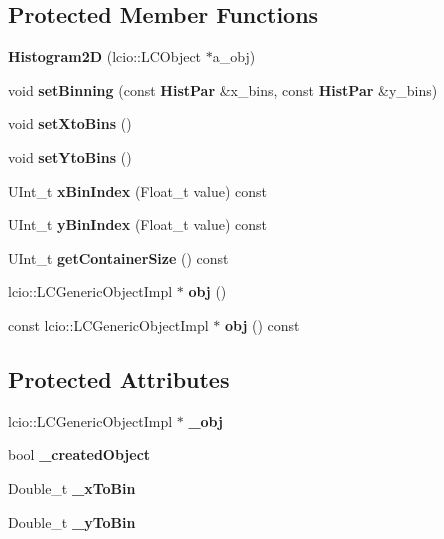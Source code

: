 \subsection*{Protected Member Functions}
\begin{DoxyCompactItemize}
\item 
{\bfseries Histogram2D} (lcio::LCObject $\ast$a\_\-obj)\label{classhistmgr_1_1Histogram2D_ade05eeddf75a2b5e341194c77fb9d101}

\item 
void {\bfseries setBinning} (const {\bf HistPar} \&x\_\-bins, const {\bf HistPar} \&y\_\-bins)\label{classhistmgr_1_1Histogram2D_a5599afe22a258e379309225ba43b8fd3}

\item 
void {\bfseries setXtoBins} ()\label{classhistmgr_1_1Histogram2D_a56dc039a37aa7bf88366e72e38535d9b}

\item 
void {\bfseries setYtoBins} ()\label{classhistmgr_1_1Histogram2D_adfafff46dede8944cb1a7569e864a1a2}

\item 
UInt\_\-t {\bfseries xBinIndex} (Float\_\-t value) const \label{classhistmgr_1_1Histogram2D_af1dab9a3f3ef0c7f015934014fbb6118}

\item 
UInt\_\-t {\bfseries yBinIndex} (Float\_\-t value) const \label{classhistmgr_1_1Histogram2D_abc60652d0255c12f81b5ac270f28e744}

\item 
UInt\_\-t {\bfseries getContainerSize} () const \label{classhistmgr_1_1Histogram2D_adc5826e91c1e1b571fb9a1a0c3cbdadf}

\item 
lcio::LCGenericObjectImpl $\ast$ {\bfseries obj} ()\label{classhistmgr_1_1Histogram2D_a858dc3152e69254166a94bd9da833be3}

\item 
const lcio::LCGenericObjectImpl $\ast$ {\bfseries obj} () const \label{classhistmgr_1_1Histogram2D_a727d937e500b3a05a8c1d9d197198bfb}

\end{DoxyCompactItemize}
\subsection*{Protected Attributes}
\begin{DoxyCompactItemize}
\item 
lcio::LCGenericObjectImpl $\ast$ {\bfseries \_\-obj}\label{classhistmgr_1_1Histogram2D_ac665536e5e1b13a7482018306b70424d}

\item 
bool {\bfseries \_\-createdObject}\label{classhistmgr_1_1Histogram2D_a5e72c0d4241393ceda4f54a441cc9d72}

\item 
Double\_\-t {\bfseries \_\-xToBin}\label{classhistmgr_1_1Histogram2D_aee7de840bafcc507ff2cf1165ad97c53}

\item 
Double\_\-t {\bfseries \_\-yToBin}\label{classhistmgr_1_1Histogram2D_af65c161601e9290bc97be2f8debbecd8}

\end{DoxyCompactItemize}
